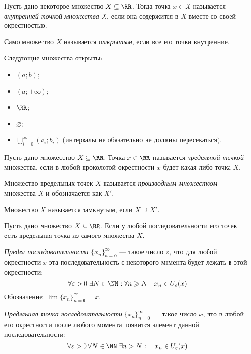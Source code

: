 \documentclass[12pt,a4paper]{article}
\begin{document}
    \begin{definition}
        Пусть дано некоторое множество $X \subseteq \RR$. Тогда точка $x \in X$ называется \emph{внутренней точкой множества} $X$, если она содержится в $X$ вместе со своей окрестностью.

        Само множество $X$ называется \emph{открытым}, если все его точки внутренние.
    \end{definition}

    \begin{example}
        Следующие множества открыты:
        \begin{itemize}
            \item $(a; b)$;
            \item $(a; +\infty)$;
            \item $\RR$;
            \item $\varnothing$;
            \item $\bigcup_{i=0}^\infty (a_i; b_i)$ (интервалы не обязательно не должны пересекаться).
        \end{itemize}
    \end{example}

    \begin{definition}
        Пусть дано множесство $X\subseteq \RR$. Точка $x \in \RR$ называется \emph{предельной точкой} множества, если в любой проколотой окрестности $x$ будет какая-либо точка $X$.

        Множество предельных точек $X$ называется \emph{производным множеством} множества $X$ и обозначается как $X'$.

        Множество $X$ называется замкнутым, если $X \supseteq X'$.
    \end{definition}

    \begin{definition}
        Пусть дано множество $X\subseteq \RR$. Если у любой последовательности его точек есть предельная точка из самого множества $X$.
    \end{definition}

    \begin{definition}
        \emph{Предел последовательности} $\{x_n\}_{n=0}^\infty$ --- такое число $x$, что для любой окрестности $x$ эта последовательность с некоторого момента будет лежать в этой окрестности:
        \[\forall \varepsilon > 0\; \exists N \in \NN: \forall n \geqslant N\quad x_n \in U_\varepsilon(x)\]
        Обозначение: $\lim \{x_n\}_{n=0}^\infty = x$.

        \emph{Предельная точка последовательности} $\{x_n\}_{n=0}^\infty$ --- такое число $x$, что в любой его окрестности после любого момента появится элемент данной последовательности:
        \[\forall \varepsilon > 0\, \forall N \in \NN\; \exists n > N: \quad x_n \in U_\varepsilon(x)\]
    \end{definition}
\end{document}
